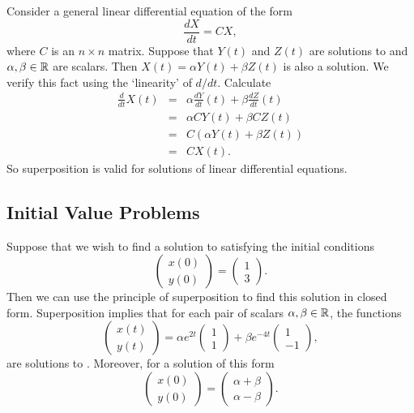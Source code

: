 \documentclass{ximera}
\begin{document}
Consider a general linear differential equation of the form
\begin{equation} \label{gen1}
\frac{dX}{dt} = CX,
\end{equation}
where $C$ is an $n\times n$ matrix.  Suppose that $Y(t)$ and
$Z(t)$ are solutions to  and $\alpha,\beta\in\mbox{$\Bbb{R}$}$ are
scalars.  Then $X(t)=\alpha Y(t)+\beta Z(t)$ is also a solution.
We verify this fact using the `linearity' of $d/dt$.  Calculate
\begin{eqnarray*}
\frac{d}{dt} X(t) & = &
\alpha \frac{dY}{dt}(t) + \beta \frac{dZ}{dt}(t) \\
 & = &\alpha CY(t) + \beta CZ(t)\\
 & = & C(\alpha Y(t) + \beta Z(t))\\
 & = & CX(t).
\end{eqnarray*}
So superposition is valid for solutions of linear differential equations.


\subsection*{Initial Value Problems}

Suppose that we wish to find a solution to
 satisfying the initial conditions
\[
\left(\begin{array}{c} x(0) \\ y(0) \end{array}\right) =
\left(\begin{array}{c}1\\3\end{array}\right).
\]
Then we can use the principle of superposition to find this solution in 
closed form.  Superposition implies that for each pair of scalars 
$\alpha,\beta\in\mbox{$\Bbb{R}$}$, the functions
\begin{equation}  \label{e:solnODE}
\left(\begin{array}{c} x(t) \\ y(t) \end{array}\right) =
\alpha e^{2t}\left(\begin{array}{c}1\\1\end{array}\right) +
\beta e^{-4t}\left(\begin{array}{r} 1\\-1\end{array}\right),
\end{equation}
are solutions to .  Moreover, for a solution of this form 
\[
\left(\begin{array}{c} x(0) \\ y(0) \end{array}\right) =
\left(\begin{array}{c} \alpha+\beta \\ \alpha-\beta
\end{array}\right).
\]
\end{document}
